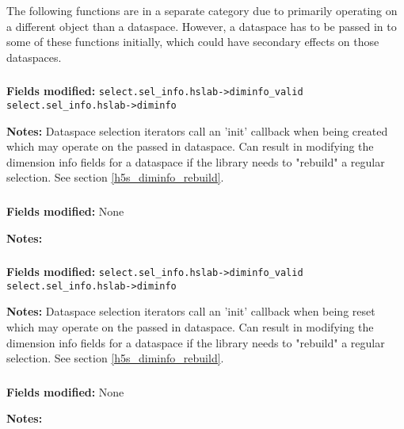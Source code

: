 \documentclass[../HDF5_RFC.tex]{subfiles}
\begin{document}
The following functions are in a separate category due to primarily operating on a different
object than a dataspace. However, a dataspace has to be passed in to some of these functions
initially, which could have secondary effects on those dataspaces.

\subsubsection{}

\textbf{Fields modified:} \texttt{select.sel\_info.hslab->diminfo\_valid} \\
\texttt{select.sel\_info.hslab->diminfo}

\textbf{Notes:} Dataspace selection iterators call an 'init' callback when being created which may
operate on the passed in dataspace. Can result in modifying the dimension info fields for a dataspace
if the library needs to "rebuild" a regular selection. See section \ref{h5s_diminfo_rebuild}.

\subsubsection{}

\textbf{Fields modified:} None

\textbf{Notes:}

\subsubsection{}

\textbf{Fields modified:} \texttt{select.sel\_info.hslab->diminfo\_valid} \\
\texttt{select.sel\_info.hslab->diminfo}

\textbf{Notes:} Dataspace selection iterators call an 'init' callback when being reset which may
operate on the passed in dataspace. Can result in modifying the dimension info fields for a dataspace
if the library needs to "rebuild" a regular selection. See section \ref{h5s_diminfo_rebuild}.

\subsubsection{}

\textbf{Fields modified:} None

\textbf{Notes:}
\end{document}
